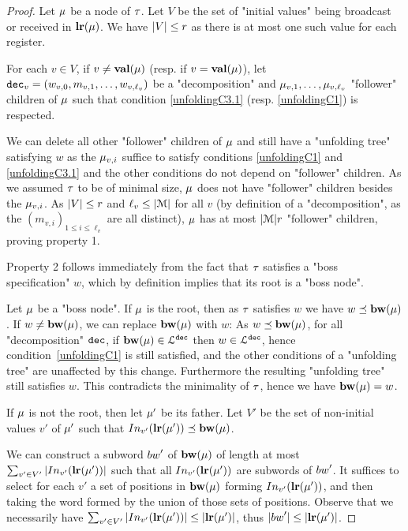 \begin{proof}
	Let $\mu$ be a node of $\tau$. 
	Let $V$ be the set of "initial values" being broadcast or received in $\mathbf{lr}(\mu)$. We have $|V|\leq r$ as there is at most one such value for each register.  
	
	For each $v \in V$, if $v \neq \mathbf{val}(\mu)$ (resp. if $v = \mathbf{val}(\mu)$), let $\mathtt{dec}_v = (w_{v,0}, m_{v,1}, \ldots, w_{v,\ell_v})$ be a "decomposition" and $\mu_{v,1}, \ldots, \mu_{v, \ell_v}$ "follower" children of $\mu$ such that condition \ref{unfoldingC3.1} (resp. \ref{unfoldingC1}) is respected.
	
	We can delete all other "follower" children of $\mu$ and still have a "unfolding tree" satisfying $w$ as the $\mu_{v,i}$ suffice to satisfy conditions \ref{unfoldingC1} and \ref{unfoldingC3.1} and the other conditions do not depend on "follower" children.
	As we assumed $\tau$ to be of minimal size, $\mu$ does not have "follower" children besides the $\mu_{v,i}$. As $|V| \leq r$ and $\ell_v \leq |\mathcal{M}|$ for all $v$ (by definition of a "decomposition", as the $(m_{v,i})_{1\leq i \leq \ell_v}$ are all distinct), $\mu$ has at most $|\mathcal{M}|r$ "follower" children, proving property 1.
	
	Property 2 follows immediately from the fact that $\tau$ satisfies a "boss specification" $w$, which by definition implies that its root is a "boss node".
	
	Let $\mu$ be a "boss node". If $\mu$ is the root, then as $\tau$ satisfies $w$ we have $w \preceq \mathbf{bw}(\mu)$. If $w \neq \mathbf{bw}(\mu)$, we can replace $\mathbf{bw}(\mu)$ with $w$: As $w \preceq \mathbf{bw}(\mu)$, for all "decomposition" $\mathtt{dec}$, if $\mathbf{bw}(\mu) \in \mathcal{L}^{\mathtt{\mathtt{dec}}}$ then $w \in \mathcal{L}^{\mathtt{\mathtt{dec}}}$, hence condition~\ref{unfoldingC1} is still satisfied, and the other conditions of a "unfolding tree" are unaffected by this change.
	Furthermore the resulting "unfolding tree" still satisfies $w$. This contradicts the minimality of $\tau$, hence we have $\mathbf{bw}(\mu) = w$.
	
	If $\mu$ is not the root, then let $\mu'$ be its father. 
	Let $V'$ be the set of non-initial values $v'$ of $\mu'$ such that $\vinput{v'}{\localrunlabel{\node'}} \subword \bosslabel{\node}$.
	
	We can construct a subword $\bossspec'$ of $\mathbf{bw}(\mu)$ of length at most $\sum_{v' \in V'} \size{\vinput{v'}{\localrunlabel{\node'}}}$ such that all $\vinput{v'}{\localrunlabel{\node'}}$ are subwords of $\bossspec'$. It suffices to select for each $v'$ a set of positions in $\mathbf{bw}(\mu)$ forming $\vinput{v'}{\localrunlabel{\node'}}$, and then taking the word formed by the union of those sets of positions.
	Observe that we necessarily have $\sum_{v' \in V'} \size{\vinput{v'}{\localrunlabel{\node'}}} \leq \size{\localrunlabel{\node'}}$, thus $\size{\bossspec'} \leq \size{\localrunlabel{\node'}}$.
	

\end{proof}
